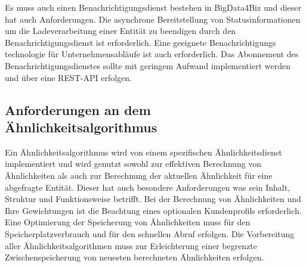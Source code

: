 Es muss auch einen Benachrichtigungsdienst bestehen in BigData4Biz und dieser hat auch Anforderungen. Die asynchrone Bereitstellung von Statusinformationen um die Ladeverarbeitung einer Entität zu beendigen durch den Benachrichtigungsdienst ist erforderlich. Eine geeignete Benachrichtigungs technologie für Unternehmensabläufe ist auch erforderlich. Das Abonnement des Benachrichtigungsdienstes sollte mit geringem Aufwand implementiert werden und über eine REST-API erfolgen.

\subsection{Anforderungen an dem Ähnlichkeitsalgorithmus}
\label{subsec:AnforderungeAehnlichkeitsalgorithmus}

Ein Ähnlichkeitsalgorithmus wird von einem spezifischen Ähnlichkeitsdienst implementiert und wird genutzt sowohl zur effektiven Berechnung von Ähnlichkeiten als auch zur Berechnung der aktuellen Ähnlichkeit für eine abgefragte Entität. Dieser hat auch besondere Anforderungen was sein Inhalt, Struktur und Funktionsweise betrifft. Bei der Berechnung von Ähnlichkeiten und Ihre Gewichtungen ist die Beachtung eines optionalen Kundenprofils erforderlich. Eine Optimierung der Speicherung von Ähnlichkeiten muss für den Speicherplatzverbrauch und für den schnellen Abruf erfolgen. Die Vorbereitung aller Ähnlichkeitsalgorithmen muss zur Erleichterung einer begrenzte Zwischenspeicherung von neuesten berechneten Ähnlichkeiten erfolgen.
